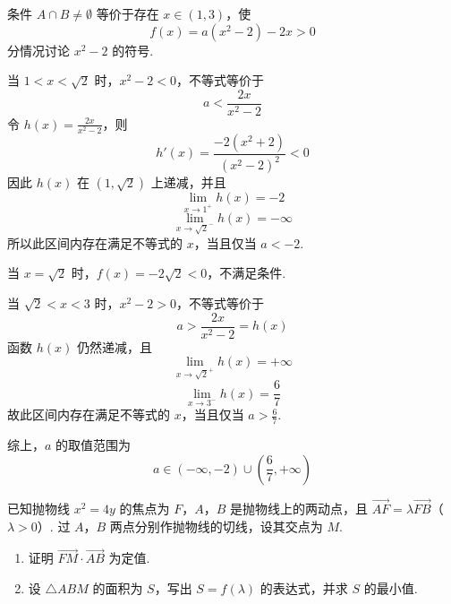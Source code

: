 \begin{solution}
条件 \(A\cap B\ne\emptyset\) 等价于存在 \(x\in(1,3)\)，使
\[
f(x)=a(x^{2}-2)-2x>0
\]
分情况讨论 \(x^{2}-2\) 的符号.

当 \(1<x<\sqrt2\) 时，\(x^{2}-2<0\)，不等式等价于
\[
a<\frac{2x}{x^{2}-2}
\]
令 \(h(x)=\frac{2x}{x^{2}-2}\)，则
\[
h'(x)=\frac{-2(x^{2}+2)}{(x^{2}-2)^{2}}<0
\]
因此 \(h(x)\) 在 \((1,\sqrt2)\) 上递减，并且
\[
\lim_{x\to1^{+}}h(x)=-2
\]
\[
\lim_{x\to\sqrt2^{-}}h(x)=-\infty
\]
所以此区间内存在满足不等式的 \(x\)，当且仅当 \(a<-2\).

当 \(x=\sqrt2\) 时，\(f(x)=-2\sqrt2<0\)，不满足条件.

当 \(\sqrt2<x<3\) 时，\(x^{2}-2>0\)，不等式等价于
\[
a>\frac{2x}{x^{2}-2}=h(x)
\]
函数 \(h(x)\) 仍然递减，且
\[
\lim_{x\to\sqrt2^{+}}h(x)=+\infty
\]
\[
\lim_{x\to3^{-}}h(x)=\frac67
\]
故此区间内存在满足不等式的 \(x\)，当且仅当 \(a>\frac67\).

综上，\(a\) 的取值范围为
\[
a\in(-\infty,-2)\cup\left(\frac67,+\infty\right)
\]
\end{solution}

\begin{problem}
已知抛物线 \(x^{2} = 4y\) 的焦点为 \(F\)，\(A\)，\(B\) 是抛物线上的两动点，且 \(\overrightarrow{AF} = \lambda \overrightarrow{FB}\)（\(\lambda > 0\)）. 过 \(A\)，\(B\) 两点分别作抛物线的切线，设其交点为 \(M\).

\begin{enumerate}
\item 证明 \( \overrightarrow{FM} \cdot \overrightarrow{AB} \) 为定值.
\item 设 \(\triangle ABM\) 的面积为 \(S\)，写出 \(S = f(\lambda)\) 的表达式，并求 \(S\) 的最小值.
\end{enumerate}
\end{problem}

